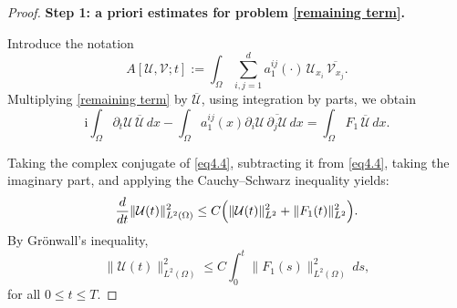 \documentclass[11pt,reqno,oneside]{amsart}
\numberwithin{equation}{section}
\theoremstyle{definition}
\theoremstyle{remark}
\numberwithin{equation}{section}
\begin{document}
	\begin{proof}
		\textbf{Step 1: a priori estimates for problem \eqref{remaining term}.}
		
		Introduce the notation
		\[
		A[\mathcal{U},\mathcal{V};t]
		:=\int_\Omega \sum_{i,j=1}^d a_1^{ij}(\cdot)\, 
		\mathcal{U}_{x_i}\, \overline{\mathcal{V}_{x_j}}.
		\]
		Multiplying \eqref{remaining term} by $\overline{\mathcal{U}}$, using integration by parts, we obtain
		\begin{equation}\label{eq4.4}
			\mathrm{i}\int_{\Omega}\partial_{t}\mathcal{U}\, \overline{\mathcal{U}}\,dx
			-\int_{\Omega}a^{ij}_{1}(x)\partial_{i}\mathcal{U}\,
			\overline{\partial_{j}\mathcal{U}}\,dx
			=\int_{\Omega}F_1\,\overline{\mathcal{U}}\,dx .
		\end{equation}
		
		Taking the complex conjugate of \eqref{eq4.4}, subtracting it from \eqref{eq4.4}, taking the imaginary part, and applying the Cauchy--Schwarz inequality yields:
		\[
		\frac{d}{dt}\|\mathcal{U}(t)\|_{L^{2}(\Omega)}^{2}
		\le C\Bigl(\|\mathcal{U}(t)\|_{L^{2}}^{2}
		+\|F_{1}(t)\|_{L^{2}}^{2}\Bigr).
		\]
		By Grönwall’s inequality,
		\begin{equation}\label{eq 4.55}
			\|\mathcal{U}(t)\|_{L^{2}(\Omega)}^{2}
			\le C\int_{0}^{t}\|F_1(s)\|_{L^{2}(\Omega)}^{2}\,ds ,
		\end{equation}
		for all $0\le t\le T$.
	

\end{proof}
\end{document}
